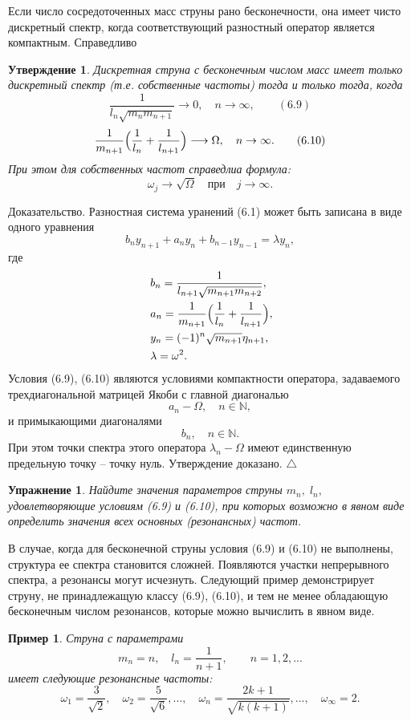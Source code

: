 \documentclass[12 pt, a4 paper]{article}
\theoremstyle{plain}   \newtheorem{Pro}{Задача}
\newtheorem{Sta}{Утверждение}
\newtheorem{Exe}{Упражнение}
\newtheorem{Exa}{Пример}
\begin{document}
Если число сосредоточенных масс струны рано бесконечности,
она имеет чисто дискретный спектр, когда соответствующий
разностный оператор является компактным. Справедливо
\begin{Sta}
Дискретная струна с бесконечным числом масс имеет только дискретный
спектр (т.е. собственные частоты) тогда и только тогда, когда
$$
  \frac{1}{l_n \sqrt{m_n m_{n+1}}}
    \longrightarrow 0 , \quad n \rightarrow \infty ,
	  \qquad (6.9)
$$
$$
  \frac{1}{m_{n+1}} \Bigl (
    \frac{1}{l_n}+\frac{1}{l_{n+1}} \Bigr )
	  \longrightarrow \Omega ,
	    \quad n \rightarrow \infty . \qquad (6.10)
$$
При этом для собственных частот справедлиа формула:
$$
  \omega _j \longrightarrow \sqrt{\Omega}
    \quad \mathrm{при} \quad j \rightarrow \infty .
$$
\end{Sta}
{\Large Доказательство.}
Разностная система уранений (6.1) может быть записана
в виде одного уравнения
$$
  b_n y_{n+1}+a_n y_n +b_{n-1}y_{n-1}=\lambda y_n ,
$$
где
\begin{align*}
  \; & b_n =\frac{1}
    {l_{n+1}\sqrt{m_{n+1}m_{n+2}}}, \\
  \; & a_n =\frac{1}{m_{n+1}} \Bigl (
    \frac{1}{l_n}+\frac{1}{l_{n+1}} \Bigr ) , \\
  \; & y_n =(-1)^n \sqrt{m_{n+1}}\eta _{n+1} , \\
  \; & \lambda =\omega ^2 .
\end{align*}
Условия (6.9), (6.10) являются условиями компактности оператора,
задаваемого трехдиагональной матрицей Якоби с главной диагональю
$$
  a_n -\Omega , \quad n \in \mathbb{N} ,
$$
и примыкающими диагоналями
$$
  b_n , \quad n \in \mathbb{N}.
$$
При этом точки спектра этого оператора
$ \lambda _n -\Omega $
имеют единственную предельную точку --
точку нуль.
Утверждение доказано.
$ \triangle $
\begin{Exe}
Найдите значения параметров струны
$ m_n , \; l_n , $
удовлетворяющие условиям (6.9) и (6.10), при которых
возможно в явном виде определить значения всех
основных (резонансных) частот.
\end{Exe}
В случае, когда для бесконечной струны условия (6.9)
и (6.10) не выполнены, структура ее спектра становится
сложней. Появляются участки непрерывного спектра,
а резонансы могут исчезнуть. Следующий пример демонстрирует струну,
не принадлежащую классу (6.9), (6.10), и тем не менее обладающую
бесконечным числом резонансов, которые можно вычислить в
явном виде.
\begin{Exa}
Струна с параметрами
$$
  m_n =n , \quad l_n =\frac{1}{n+1} ,
    \quad \quad n=1,2,...
$$
имеет следующие резонансные частоты:
$$
  \omega _1 =\frac{3}{\sqrt{2}}, \quad
  \omega _2 =\frac{5}{\sqrt{6}},...,\quad
  \omega _n =\frac{2k+1}{\sqrt{k(k+1)}}, ..., \quad
  \omega _{\infty}=2.
$$
\end{Exa}
\newpage
\end{document}
